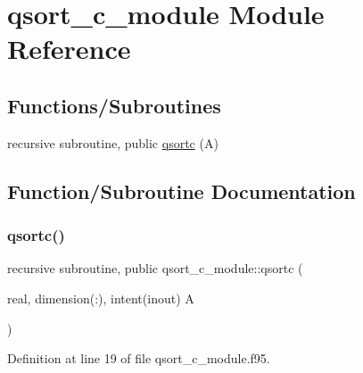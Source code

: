 \hypertarget{namespaceqsort__c__module}{}\section{qsort\+\_\+c\+\_\+module Module Reference}
\label{namespaceqsort__c__module}
\subsection*{Functions/\+Subroutines}
\begin{DoxyCompactItemize}
\item 
recursive subroutine, public \hyperlink{namespaceqsort__c__module_a7e39c2068ea2fa39ea9aa0d7757ceb58}{qsortc} (A)
\end{DoxyCompactItemize}


\subsection{Function/\+Subroutine Documentation}
\mbox{\label{namespaceqsort__c__module_a7e39c2068ea2fa39ea9aa0d7757ceb58}} 
\subsubsection{\texorpdfstring{qsortc()}{qsortc()}}
{\footnotesize\ttfamily recursive subroutine, public qsort\+\_\+c\+\_\+module\+::qsortc (\begin{DoxyParamCaption}\item[{real, dimension(\+:), intent(inout)}]{A }\end{DoxyParamCaption})}



Definition at line 19 of file qsort\+\_\+c\+\_\+module.\+f95.


